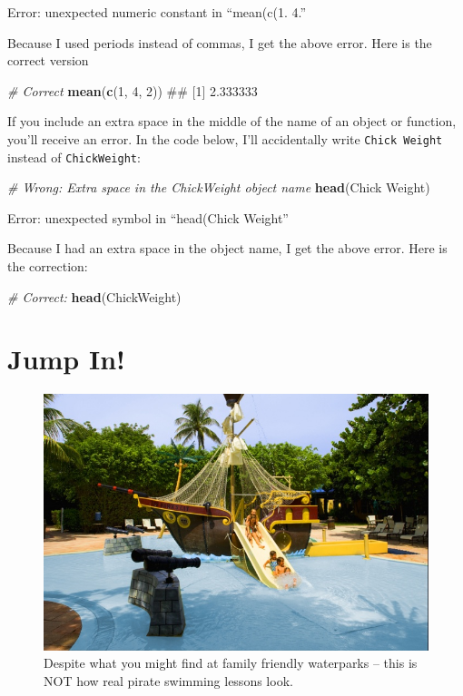 \documentclass[]{book}
\newenvironment{Shaded}{\begin{snugshade}}{\end{snugshade}}
\newcommand{\KeywordTok}[1]{\textcolor[rgb]{0.13,0.29,0.53}{\textbf{#1}}}
\newcommand{\DecValTok}[1]{\textcolor[rgb]{0.00,0.00,0.81}{#1}}
\newcommand{\CommentTok}[1]{\textcolor[rgb]{0.56,0.35,0.01}{\textit{#1}}}
\newcommand{\NormalTok}[1]{#1}
\theoremstyle{definition}
\theoremstyle{definition}
\theoremstyle{remark}
\begin{document}
Error: unexpected numeric constant in ``mean(c(1. 4.''

Because I used periods instead of commas, I get the above error. Here is
the correct version

\begin{Shaded}
\begin{Highlighting}[]
\CommentTok{# Correct}
\KeywordTok{mean}\NormalTok{(}\KeywordTok{c}\NormalTok{(}\DecValTok{1}\NormalTok{, }\DecValTok{4}\NormalTok{, }\DecValTok{2}\NormalTok{))}
\NormalTok{## [1] 2.333333}
\end{Highlighting}
\end{Shaded}

If you include an extra space in the middle of the name of an object or
function, you'll receive an error. In the code below, I'll accidentally
write \texttt{Chick\ Weight} instead of \texttt{ChickWeight}:

\begin{Shaded}
\begin{Highlighting}[]
\CommentTok{# Wrong: Extra space in the ChickWeight object name}
\KeywordTok{head}\NormalTok{(Chick Weight)}
\end{Highlighting}
\end{Shaded}

Error: unexpected symbol in ``head(Chick Weight''

Because I had an extra space in the object name, I get the above error.
Here is the correction:

\begin{Shaded}
\begin{Highlighting}[]
\CommentTok{# Correct:}
\KeywordTok{head}\NormalTok{(ChickWeight)}
\end{Highlighting}
\end{Shaded}

\chapter{Jump In!}\label{jumpin}

\begin{figure}

{\centering \includegraphics[width=0.75\linewidth]{images/pirateswimming} 

}

\caption{Despite what you might find at family friendly waterparks -- this is NOT how real pirate swimming lessons look.}\label{fig:unnamed-chunk-30}
\end{figure}
\end{document}
